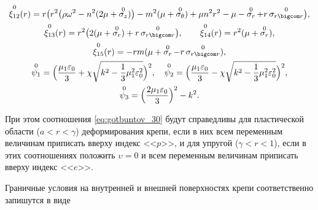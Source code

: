 \begin{gather*}
\\

\mathop{\xi_{12}}\limits^{0}(r)=r\bigl(r^2\bigl(\rho\omega^2-n^2(2\mu+\mathop{\sigma_z}\limits^{0})\bigr)-m^2(\mu+\mathop{\sigma_{\theta}}\limits^{0})+\mu n^2r^2-\mu-\mathop{\sigma_r}\limits^{0}+r\mathop{\sigma_{r \bigcom r}}\limits^{0}\bigr),%

\\

\mathop{\xi_{13}}\limits^{0}(r)=r^2\bigl(2(\mu+\mathop{\sigma_r}\limits^{0})+r\mathop{\sigma_{r \bigcom r}}\limits^{0}\bigr),\qquad 

\mathop{\xi_{14}}\limits^{0}(r)=r^2 (\mu+\mathop{\sigma_r}\limits^{0} ),%

\\

\mathop{\xi_{15}}\limits^{0}(r)=-rm (\mu+\mathop{\sigma_r}\limits^{0}-r\mathop{\sigma_{r \bigcom r}}\limits^{0} ), %

\\

\mathop{\psi_1}\limits^{0}=\Bigl(\frac{\mu_1\varepsilon_0}{3}+\chi\sqrt{k^2-\frac{1}{3}\mu_1^2\varepsilon_0^2}\Bigr)^2, \quad  

\mathop{\psi_2}\limits^{0}=\Bigl(\frac{\mu_1\varepsilon_0}{3}-\chi\sqrt{k^2-\frac{1}{3}\mu_1^2\varepsilon_0^2}\Bigr)^2, %

\\ 

\mathop{\psi_3}\limits^{0}=\Bigl(\frac{2\mu_1\varepsilon_0}{3}\Bigr)^2-k^2.

\end{gather*}



При этом соотношения \eqref{eq:gotbuntov_30} будут справедливы для пластической области ($a<r<\gamma$) деформирования крепи, если в них всем переменным величинам приписать вверху индекс <<$p$>>, и для упругой ($\gamma <r<1$), если в этих соотношениях положить $\upsilon=0$ и всем переменным величинам приписать вверху индекс <<$e$>>.



Граничные условия на внутренней и внешней поверхностях крепи соответственно запишутся в виде

